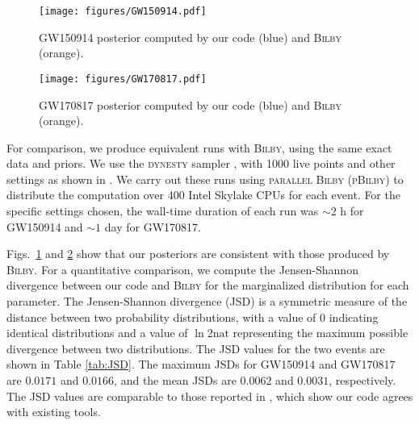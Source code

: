 \documentclass[twocolumn]{aastex631}
\begin{document}
\begin{figure}
    \texttt{[image: figures/GW150914.pdf]}
    \caption{
      GW150914 posterior computed by our code (blue) and \textsc{Bilby} (orange).
    }
    \label{fig:GW150914}
\end{figure}

\begin{figure}
\texttt{[image: figures/GW170817.pdf]}
\caption{
    GW170817 posterior computed by our code (blue) and \textsc{Bilby} (orange).
}
\label{fig:GW170817}
\end{figure}

For comparison, we produce equivalent runs with \textsc{Bilby}, using the same
exact data and priors.  We use the \textsc{dynesty} sampler
\cite{2020MNRAS.493.3132S,dynesty}, with 1000 live points and other settings as
shown in \cite{release}.  We carry out these runs using \textsc{parallel Bilby}
(\textsc{pBilby}) \cite{Smith:2019ucc} to distribute the computation over 400
Intel Skylake CPUs for each event.  For the specific settings chosen, the
wall-time duration of each run was ${\sim}2$ h for GW150914 and ${\sim}1$ day
for GW170817.


Figs.~\ref{fig:GW150914} and \ref{fig:GW170817} show that our posteriors are
consistent with those produced by \textsc{Bilby}.  For a quantitative
comparison, we compute the Jensen-Shannon divergence between our code and
\textsc{Bilby} for the marginalized distribution for each parameter. The
Jensen-Shannon divergence (JSD) is a symmetric measure of the distance between
two probability distributions, with a value of 0 indicating identical
distributions and a value of $\ln{2} \textrm{nat}$ representing the maximum
possible divergence between two distributions. The JSD values for the two events
are shown in Table \ref{tab:JSD}. The maximum JSDs for GW150914 and GW170817 are
$0.0171$ and $0.0166$, and the mean JSDs are $0.0062$ and $0.0031$,
respectively. The JSD values are comparable to those reported in
\cite{Romero-Shaw:2020owr}, which show our code agrees with existing tools.
\end{document}
